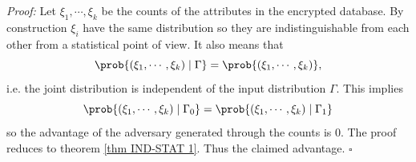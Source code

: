 \textit{Proof:} Let $\xi_1, \cdots, \xi_k$ be the counts of the attributes in the encrypted database. By construction $\xi_i$ have the same distribution so they are indistinguishable from each other from a statistical point of view. It also means that
\begin{equation*}
	\prob{(\xi_1, \cdots, \xi_k) \mid \Gamma} = \prob{(\xi_1, \cdots, \xi_k)},
\end{equation*}
i.e. the joint distribution is independent of the input distribution $\Gamma$. This implies
\begin{equation*}
	\prob{(\xi_1, \cdots, \xi_k) \mid \Gamma_0} = \prob{(\xi_1, \cdots, \xi_k) \mid \Gamma_1}
\end{equation*}
so the advantage of the adversary generated through the counts is 0. The proof reduces to theorem \ref{thm IND-STAT 1}. Thus the claimed advantage. $\square$











